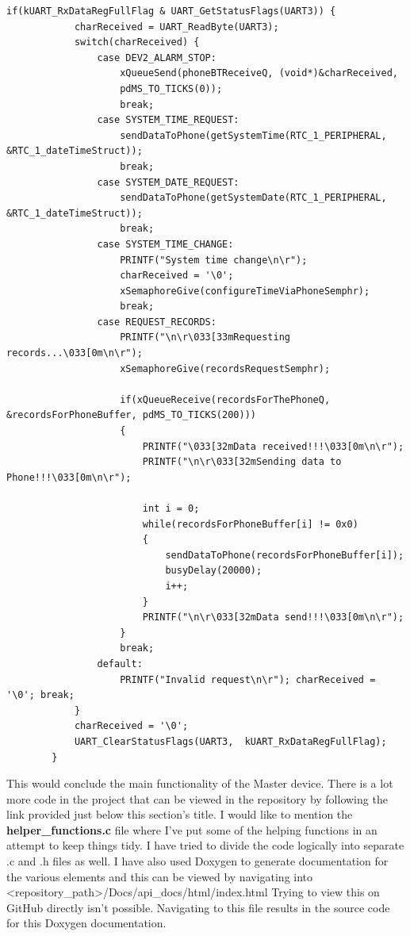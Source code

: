 \documentclass[12pt,a4paper]{article}
\begin{document}
        \begin{lstlisting}[label={lst:phoneBTTaskSwitch}, caption=Phone request resolution]
        if(kUART_RxDataRegFullFlag & UART_GetStatusFlags(UART3)) {
            charReceived = UART_ReadByte(UART3);
            switch(charReceived) {
                case DEV2_ALARM_STOP: 		
                    xQueueSend(phoneBTReceiveQ, (void*)&charReceived,
                    pdMS_TO_TICKS(0)); 
                    break;
                case SYSTEM_TIME_REQUEST: 	
                    sendDataToPhone(getSystemTime(RTC_1_PERIPHERAL, &RTC_1_dateTimeStruct));
                    break;
                case SYSTEM_DATE_REQUEST: 	
                    sendDataToPhone(getSystemDate(RTC_1_PERIPHERAL, &RTC_1_dateTimeStruct));
                    break;
                case SYSTEM_TIME_CHANGE:	
                    PRINTF("System time change\n\r");
                    charReceived = '\0';
                    xSemaphoreGive(configureTimeViaPhoneSemphr);
                    break;
                case REQUEST_RECORDS:		
                    PRINTF("\n\r\033[33mRequesting records...\033[0m\n\r");
                    xSemaphoreGive(recordsRequestSemphr);

                    if(xQueueReceive(recordsForThePhoneQ, &recordsForPhoneBuffer, pdMS_TO_TICKS(200)))
                    {
                        PRINTF("\033[32mData received!!!\033[0m\n\r");
                        PRINTF("\n\r\033[32mSending data to Phone!!!\033[0m\n\r");

                        int i = 0;
                        while(recordsForPhoneBuffer[i] != 0x0)
                        {
                            sendDataToPhone(recordsForPhoneBuffer[i]);
                            busyDelay(20000);
                            i++;
                        }
                        PRINTF("\n\r\033[32mData send!!!\033[0m\n\r");
                    }
                    break;
                default:					
                    PRINTF("Invalid request\n\r"); charReceived = '\0'; break;
            } 
            charReceived = '\0';
            UART_ClearStatusFlags(UART3,  kUART_RxDataRegFullFlag);
        } 
        \end{lstlisting}
        
    This would conclude the main functionality of the Master device. There is a lot more code in the project that can be viewed in the repository by following the link provided just below this section's title. I would like to mention the {\bfseries helper\_functions.c} file where I've put some of the helping functions in an attempt to keep things tidy. I have tried to divide the code logically into separate .c and .h files as well. I have also used Doxygen to generate documentation for the various elements and this can be viewed by navigating into <repository\_path>/Docs/api\_docs/html/index.html Trying to view this on GitHub directly isn't possible. Navigating to this file results in the source code for this Doxygen documentation. 
    
\end{document}
